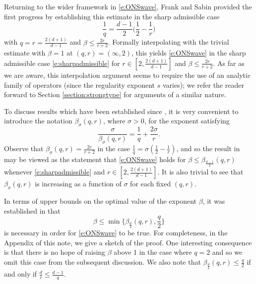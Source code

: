 \documentclass[a4paper]{amsart}
\numberwithin{equation}{section}%
\theoremstyle{plain}%
\theoremstyle{definition}
\theoremstyle{remark}%
\begin{document}
Returning to the wider framework in \eqref{e:ONSwave},
Frank and Sabin \cite{FS_AJM} provided the first progress by establishing this estimate in the sharp admissible case
\begin{equation} \label{e:sharpadmissible}
\frac{1}{q} = \frac{d-1}{2}\bigg(\frac{1}{2} - \frac{1}{r}\bigg)
\end{equation}
with $q = r = \frac{2(d+1)}{d-1}$ and $\beta \leq \frac{2r}{r +2}$. Formally interpolating with the trivial estimate with $\beta = 1$ at $(q,r) = (\infty,2)$, this yields \eqref{e:ONSwave} in the sharp admissible case \eqref{e:sharpadmissible} for $r \in [2, \frac{2(d+1)}{d-1}]$ and $\beta \leq \frac{2r}{r +2}$. As far as we are aware, this interpolation argument seems to require the use of an analytic family of operators (since the regularity exponent $s$ varies); we refer the reader forward to Section \ref{section:strongtype} for arguments of a similar nature.

To discuss results which have been established since \cite{FS_AJM}, it is very convenient to introduce the notation $\beta_\sigma(q,r)$, where $\sigma > 0$, for the exponent satisfying 
\[
\frac{\sigma}{\beta_\sigma(q,r)} = \frac{1}{q} + \frac{2\sigma}{r}.
\]
Observe that $\beta_\sigma(q,r) = \frac{2r}{r + 2}$ in the case $\frac{1}{q} = \sigma(\frac{1}{2} - \frac{1}{r})$, and so the result in \cite{FS_AJM} may be viewed as the statement that \eqref{e:ONSwave} holds for $\beta \leq \beta_{\frac{d-1}{2}}(q,r)$ whenever \eqref{e:sharpadmissible} and  $r \in [2,\frac{2(d+1)}{d-1}]$. It is also trivial to see that $\beta_\sigma(q,r)$ is increasing as a function of $\sigma$ for each fixed $(q,r)$.

In terms of upper bounds on the optimal value of the exponent $\beta$, it was established in \cite{BLN_Forum} that 
\begin{equation} \label{e:necessary}
\beta \leq \min\bigg\{\beta_{\frac{d}{2}}(q,r), \frac{q}{2} \bigg\}
\end{equation}
is necessary in order for \eqref{e:ONSwave} to be true. For completeness, in the Appendix of this note, we give a sketch of the proof. One interesting consequence is that there is no hope of raising $\beta$ above 1 in the case where $q = 2$ and so we omit this case from the subsequent discussion.
We also note that $\beta_{\frac{d}{2}}(q,r) \leq \frac{q}{2}$ if and only if $\frac{d}{r} \leq \frac{d-1}{q}$.
\end{document}
